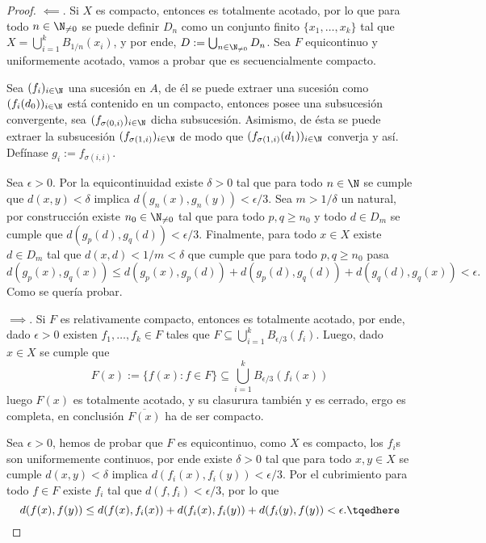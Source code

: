 \documentclass[topologia-analisis.tex]{subfiles}
\begin{document}
\begin{proof}
	$\impliedby$. Si $X$ es compacto, entonces es totalmente acotado, por lo que para todo $n\in\N_{\ne 0}$ se puede definir $D_n$ como un conjunto finito $\{x_1,\dots,x_k\}$ tal que $X = \bigcup_{i=1}^k B_{1/n}(x_i)$, y por ende, $D := \bigcup_{n\in\N_{\ne 0}} D_n$.
	Sea $F$ equicontinuo y uniformemente acotado, vamos a probar que es secuencialmente compacto.
	\par
	Sea $(f_i)_{i\in\N}$ una sucesión en $A$, de él se puede extraer una sucesión como $(f_i(d_0))_{i\in\N}$ está contenido en un compacto, entonces posee una subsucesión convergente, sea $(f_{\sigma(0,i)})_{i\in\N}$ dicha subsucesión.
	Asimismo, de ésta se puede extraer la subsucesión $(f_{\sigma(1,i)})_{i\in\N}$ de modo que $(f_{\sigma(1,i)}(d_1))_{i\in\N}$ converja y así.
	Defínase $g_i := f_{\sigma(i,i)}$.
	\par
	Sea $\epsilon > 0$.
	Por la equicontinuidad existe $\delta > 0$ tal que para todo $n\in\N$ se cumple que $d(x, y) < \delta$ implica $d(g_n(x), g_n(y)) < \epsilon/3$.
	Sea $m > 1/\delta$ un natural, por construcción existe $n_0 \in \N_{\ne 0}$ tal que para todo $p,q\ge n_0$ y todo $d\in D_m$ se cumple que $d(g_p(d), g_q(d)) < \epsilon/3$.
	Finalmente, para todo $x\in X$ existe $d\in D_m$ tal que $d(x, d) < 1/m < \delta$ que cumple que para todo $p,q\ge n_0$ pasa
	$$ d(g_p(x), g_q(x)) \le d(g_p(x), g_p(d)) + d(g_p(d), g_q(d)) + d(g_q(d), g_q(x)) < \epsilon. $$
	Como se quería probar.
	\par
	$\implies$. Si $F$ es relativamente compacto, entonces es totalmente acotado, por ende, dado $\epsilon > 0$ existen $f_1,\dots,f_k\in F$ tales que $F \subseteq \bigcup_{i=1}^k B_{\epsilon/3}(f_i)$.
	Luego, dado $x\in X$ se cumple que
	$$ F(x) := \{f(x): f\in F\} \subseteq \bigcup_{i=1}^k B_{\epsilon/3}(f_i(x)) $$
	luego $F(x)$ es totalmente acotado, y su clasurura también y es cerrado, ergo es completa, en conclusión $\overline{F(x)}$ ha de ser compacto.
	\par
	Sea $\epsilon > 0$, hemos de probar que $F$ es equicontinuo, como $X$ es compacto, los $f_i$s son uniformemente continuos, por ende existe $\delta > 0$ tal que para todo $x,y\in X$ se cumple $d(x,y)<\delta$ implica $d(f_i(x), f_i(y)) < \epsilon/3$.
	Por el cubrimiento para todo $f\in F$ existe $f_i$ tal que $d(f, f_i) < \epsilon/3$, por lo que
	\begin{equation}
		d(f(x), f(y)) \le d(f(x), f_i(x)) + d(f_i(x), f_i(y)) + d(f_i(y), f(y)) < \epsilon. \tqedhere
	\end{equation}
\end{proof}
\thmdep{}
\end{document}
